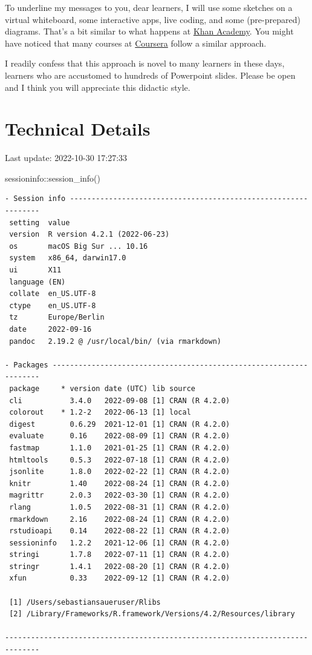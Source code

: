 \documentclass[
  letterpaper,
  DIV=11,
  numbers=noendperiod]{scrreprt}
\newenvironment{Shaded}{\begin{snugshade}}{\end{snugshade}}
\newcommand{\FunctionTok}[1]{\textcolor[rgb]{0.28,0.35,0.67}{#1}}
\newcommand{\NormalTok}[1]{\textcolor[rgb]{0.00,0.23,0.31}{#1}}
\newcommand{\SpecialCharTok}[1]{\textcolor[rgb]{0.37,0.37,0.37}{#1}}
\theoremstyle{definition}
\theoremstyle{definition}
\theoremstyle{remark}
\begin{document}
To underline my messages to you, dear learners, I will use some sketches
on a virtual whiteboard, some interactive apps, live coding, and some
(pre-prepared) diagrams. That's a bit similar to what happens at
\href{https://de.khanacademy.org/}{Khan Academy}. You might have noticed
that many courses at \href{https://www.coursera.org/}{Coursera} follow a
similar approach.

I readily confess that this approach is novel to many learners in these
days, learners who are accustomed to hundreds of Powerpoint slides.
Please be open and I think you will appreciate this didactic style.

\hypertarget{technical-details}{%
\section*{Technical Details}\label{technical-details}}

Last update: 2022-10-30 17:27:33

\begin{Shaded}
\begin{Highlighting}[]
\NormalTok{sessioninfo}\SpecialCharTok{::}\FunctionTok{session\_info}\NormalTok{()}
\end{Highlighting}
\end{Shaded}

\begin{verbatim}
- Session info ---------------------------------------------------------------
 setting  value
 version  R version 4.2.1 (2022-06-23)
 os       macOS Big Sur ... 10.16
 system   x86_64, darwin17.0
 ui       X11
 language (EN)
 collate  en_US.UTF-8
 ctype    en_US.UTF-8
 tz       Europe/Berlin
 date     2022-09-16
 pandoc   2.19.2 @ /usr/local/bin/ (via rmarkdown)

- Packages -------------------------------------------------------------------
 package     * version date (UTC) lib source
 cli           3.4.0   2022-09-08 [1] CRAN (R 4.2.0)
 colorout    * 1.2-2   2022-06-13 [1] local
 digest        0.6.29  2021-12-01 [1] CRAN (R 4.2.0)
 evaluate      0.16    2022-08-09 [1] CRAN (R 4.2.0)
 fastmap       1.1.0   2021-01-25 [1] CRAN (R 4.2.0)
 htmltools     0.5.3   2022-07-18 [1] CRAN (R 4.2.0)
 jsonlite      1.8.0   2022-02-22 [1] CRAN (R 4.2.0)
 knitr         1.40    2022-08-24 [1] CRAN (R 4.2.0)
 magrittr      2.0.3   2022-03-30 [1] CRAN (R 4.2.0)
 rlang         1.0.5   2022-08-31 [1] CRAN (R 4.2.0)
 rmarkdown     2.16    2022-08-24 [1] CRAN (R 4.2.0)
 rstudioapi    0.14    2022-08-22 [1] CRAN (R 4.2.0)
 sessioninfo   1.2.2   2021-12-06 [1] CRAN (R 4.2.0)
 stringi       1.7.8   2022-07-11 [1] CRAN (R 4.2.0)
 stringr       1.4.1   2022-08-20 [1] CRAN (R 4.2.0)
 xfun          0.33    2022-09-12 [1] CRAN (R 4.2.0)

 [1] /Users/sebastiansaueruser/Rlibs
 [2] /Library/Frameworks/R.framework/Versions/4.2/Resources/library

------------------------------------------------------------------------------
\end{verbatim}
\end{document}
